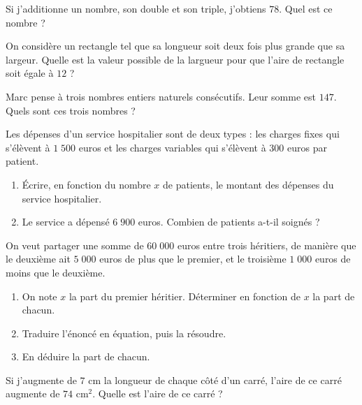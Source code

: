 \documentclass[11pt]{article}
\begin{document}
\begin{exo}
  Si j'additionne un nombre, son double et son triple, j'obtiens $78$. Quel est
  ce nombre ?
\end{exo}

\begin{exo}
  On considère un rectangle tel que sa longueur soit deux fois plus grande que
  sa largeur. Quelle est la valeur possible de la largueur pour que l'aire de
  rectangle soit égale à $12$ ?
\end{exo}

\begin{exo}
  Marc pense à trois nombres entiers naturels consécutifs. Leur somme est $147$.
  Quels sont ces trois nombres ?
\end{exo}

\begin{exo}
  Les dépenses d'un service hospitalier sont de deux types : les charges fixes
  qui s'élèvent à $1\;500$ euros et les charges variables qui s'élèvent à $300$
  euros par patient.
  \begin{enumerate}
    \item Écrire, en fonction du nombre $x$ de patients, le montant des
      dépenses du service hospitalier.
    \item Le service a dépensé $6\;900$ euros. Combien de patients a-t-il
      soignés ?
  \end{enumerate}
\end{exo}

\begin{exo}
  On veut partager une somme de $60\;000$ euros entre trois héritiers, de manière
  que le deuxième ait $5\;000$ euros de plus que le premier, et le troisième $1\;000$
  euros de moins que le deuxième.
  \begin{enumerate}
    \item On note $x$ la part du premier héritier. Déterminer en fonction de $x$
      la part de chacun.
    \item Traduire l'énoncé en équation, puis la résoudre.
    \item En déduire la part de chacun.
  \end{enumerate}
\end{exo}

\begin{exo}
  Si j'augmente de $7$ cm la longueur de chaque côté d'un carré, l'aire de ce
  carré augmente de $74$ cm$^2$. Quelle est l'aire de ce carré ?
\end{exo}
\end{document}
